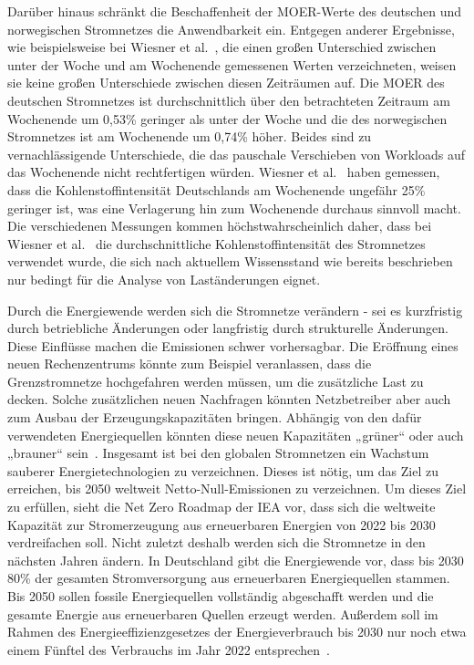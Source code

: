 Darüber hinaus schränkt die Beschaffenheit der \ac{MOER}-Werte des deutschen und norwegischen Stromnetzes die Anwendbarkeit ein.
Entgegen anderer Ergebnisse, wie beispielsweise bei Wiesner et al.~\cite{Wiesner.2021}, die einen großen Unterschied zwischen unter der Woche und am Wochenende gemessenen Werten verzeichneten, weisen sie keine großen Unterschiede zwischen diesen Zeiträumen auf.
Die \ac{MOER} des deutschen Stromnetzes ist durchschnittlich über den betrachteten Zeitraum am Wochenende um 0,53\% geringer als unter der Woche und die des norwegischen Stromnetzes ist am Wochenende um 0,74\% höher.
Beides sind zu vernachlässigende Unterschiede, die das pauschale Verschieben von Workloads auf das Wochenende nicht rechtfertigen würden.
Wiesner et al.~\cite{Wiesner.2021} haben gemessen, dass die Kohlenstoffintensität Deutschlands am Wochenende ungefähr 25\% geringer ist, was eine Verlagerung hin zum Wochenende durchaus sinnvoll macht.
Die verschiedenen Messungen kommen höchstwahrscheinlich daher, dass bei Wiesner et al.~\cite{Wiesner.2021} die durchschnittliche Kohlenstoffintensität des Stromnetzes verwendet wurde, die sich nach aktuellem Wissensstand wie bereits beschrieben nur bedingt für die Analyse von Laständerungen eignet.

Durch die Energiewende werden sich die Stromnetze verändern - sei es kurzfristig durch betriebliche Änderungen oder langfristig durch strukturelle Änderungen.
Diese Einflüsse machen die Emissionen schwer vorhersagbar.
Die Eröffnung eines neuen Rechenzentrums könnte zum Beispiel veranlassen, dass die Grenzstromnetze hochgefahren werden müssen, um die zusätzliche Last zu decken.
Solche zusätzlichen neuen Nachfragen könnten Netzbetreiber aber auch zum Ausbau der Erzeugungskapazitäten bringen.
Abhängig von den dafür verwendeten Energiequellen könnten diese neuen Kapazitäten „grüner“ oder auch „brauner“ sein~\cite{WattTime.2022}.
Insgesamt ist bei den globalen Stromnetzen ein Wachstum sauberer Energietechnologien zu verzeichnen.
Dieses ist nötig, um das Ziel zu erreichen, bis 2050 weltweit Netto-Null-Emissionen zu verzeichnen.
Um dieses Ziel zu erfüllen, sieht die Net Zero Roadmap der IEA vor, dass sich die weltweite Kapazität zur Stromerzeugung aus erneuerbaren Energien von 2022 bis 2030 verdreifachen soll.
Nicht zuletzt deshalb werden sich die Stromnetze in den nächsten Jahren ändern.
In Deutschland gibt die Energiewende vor, dass bis 2030 80\% der gesamten Stromversorgung aus erneuerbaren Energiequellen stammen.
Bis 2050 sollen fossile Energiequellen vollständig abgeschafft werden und die gesamte Energie aus erneuerbaren Quellen erzeugt werden.
Außerdem soll im Rahmen des Energieeffizienzgesetzes der Energieverbrauch bis 2030 nur noch etwa einem Fünftel des Verbrauchs im Jahr 2022 entsprechen~\cite{InternationalEnergyAgengy.2023}.

